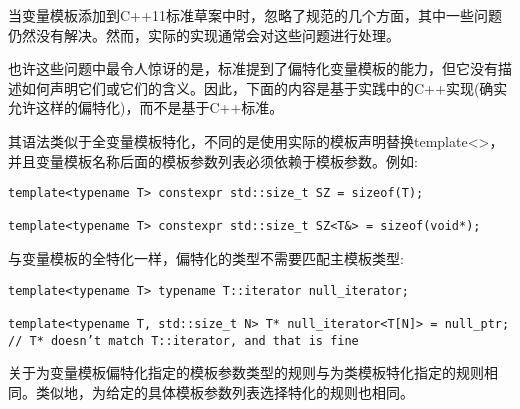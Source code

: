 当变量模板添加到C++11标准草案中时，忽略了规范的几个方面，其中一些问题仍然没有解决。然而，实际的实现通常会对这些问题进行处理。

也许这些问题中最令人惊讶的是，标准提到了偏特化变量模板的能力，但它没有描述如何声明它们或它们的含义。因此，下面的内容是基于实践中的C++实现(确实允许这样的偏特化)，而不是基于C++标准。

其语法类似于全变量模板特化，不同的是使用实际的模板声明替换template<>，并且变量模板名称后面的模板参数列表必须依赖于模板参数。例如:

\begin{lstlisting}[style=styleCXX]
template<typename T> constexpr std::size_t SZ = sizeof(T);

template<typename T> constexpr std::size_t SZ<T&> = sizeof(void*);
\end{lstlisting}

与变量模板的全特化一样，偏特化的类型不需要匹配主模板类型:

\begin{lstlisting}[style=styleCXX]
template<typename T> typename T::iterator null_iterator;

template<typename T, std::size_t N> T* null_iterator<T[N]> = null_ptr;
// T* doesn’t match T::iterator, and that is fine
\end{lstlisting}

关于为变量模板偏特化指定的模板参数类型的规则与为类模板特化指定的规则相同。类似地，为给定的具体模板参数列表选择特化的规则也相同。





































